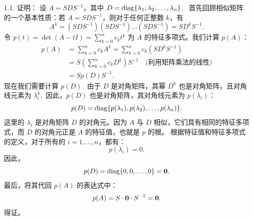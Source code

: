 \begin{exer}


1.1. 证明：
设 $A = SDS^{-1}$，其中 $D = \operatorname{diag}\{\lambda_1, \lambda_2, \dots, \lambda_n\}$.~
首先回顾相似矩阵的一个基本性质：若 $A = SDS^{-1}$，则对于任何正整数 $k$，有
$$ A^k = (SDS^{-1})(SDS^{-1})\dots(SDS^{-1}) = SD^kS^{-1}. $$
令 $p(t)=\det(A-tI)=\sum_{k=0}^n c_k t^k$ 为 $A$ 的特征多项式。我们计算 $p(A)$：
$$
\begin{aligned}
p(A) &= \sum_{k=0}^n c_k A^k = \sum_{k=0}^n c_k (S D^k S^{-1}) \\
&= S \left( \sum_{k=0}^n c_k D^k \right) S^{-1} \quad \text{(利用矩阵乘法的线性)} \\
&= S p(D) S^{-1}.
\end{aligned}
$$
现在我们需要计算 $p(D)$.~由于 $D$ 是对角矩阵，其幂 $D^k$ 也是对角矩阵，且对角线元素为 $\lambda_i^k$.~因此，$p(D)$ 也是对角矩阵，其对角线元素为 $p(\lambda_i)$：
$$
p(D) = \operatorname{diag}\{ p(\lambda_1), p(\lambda_2), \dots, p(\lambda_n) \}.
$$
这里的 $\lambda_i$ 是对角矩阵 $D$ 的对角元。因为 $A$ 与 $D$ 相似，它们具有相同的特征多项式，而 $D$ 的对角元正是 $A$ 的特征值，也就是 $p$ 的根。
根据特征值和特征多项式的定义，对于所有的 $i = 1, \dots, n$，都有：
$$ p(\lambda_i) = 0. $$
因此，
$$ p(D) = \operatorname{diag}\{ 0, 0, \dots, 0 \} = \mathbf{0}. $$
最后，将其代回 $p(A)$ 的表达式中：
$$ p(A) = S \cdot \mathbf{0} \cdot S^{-1} = \mathbf{0}. $$
得证。


\vspace{5ex}


\end{exer}
